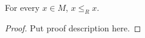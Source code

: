 
\begin{lemma}[Reflexivity of \(\le_R\)]
  \label{lem:RRel-refl}
  For every \(x\in M\), \(x \le_R x\).
  \leanok
\end{lemma}
\begin{proof}
  \leanok
  Put proof description here.
\end{proof}

